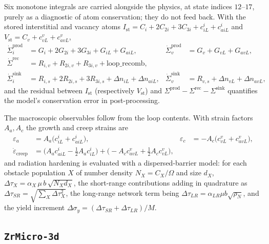 \documentclass{article}
\newcommand{\ZrM}{\texttt{ZrMicro-3d}}
\begin{document}
Six monotone integrals are carried alongside the physics, at state indices
$12\text{--}17$, purely as a diagnostic of atom conservation; they do not feed
back. With the stored interstitial and vacancy atoms
$I_{\mathrm{st}}=C_i+2C_{2i}+3C_{3i}+c_{iL}^{i}+c_{aiL}^{i}$ and
$V_{\mathrm{st}}=C_v+c_{vL}^{v}+c_{avL}^{v}$,
\begin{align}
\dot{\Sigma}^{\mathrm{prod}}_i &= G_i+2G_{2i}+3G_{3i}+G_{iL}+G_{aiL}, &
\dot{\Sigma}^{\mathrm{prod}}_v &= G_v+G_{vL}+G_{avL},\\
\dot{\Sigma}^{\mathrm{rec}} &= R_{i,v}+R_{2i,v}+R_{3i,v}+\text{loop\_recomb}, & & \\
\dot{\Sigma}^{\mathrm{sink}}_i &= R_{i,s}+2R_{2i,s}+3R_{3i,s}+\Delta n_{iL}+\Delta n_{aiL}, &
\dot{\Sigma}^{\mathrm{sink}}_v &= R_{v,s}+\Delta n_{vL}+\Delta n_{avL},
\end{align}
and the residual between $I_{\mathrm{st}}$ (respectively $V_{\mathrm{st}}$) and
$\Sigma^{\mathrm{prod}}-\Sigma^{\mathrm{rec}}-\Sigma^{\mathrm{sink}}$ quantifies
the model's conservation error in post-processing.

The macroscopic observables follow from the loop contents. With strain factors
$A_a,A_c$ the growth and creep strains are
\begin{align}
\varepsilon_a &= A_a\bigl(c_{iL}^{i}+c_{aiL}^{i}\bigr), &
\varepsilon_c &= -A_c\bigl(c_{vL}^{v}+c_{avL}^{v}\bigr),\\
\dot\varepsilon_{\mathrm{creep}} &= \bigl(A_a c_{aiL}^{i}-\tfrac12 A_a c_{iL}^{i}\bigr)
   +\bigl(-A_c c_{avL}^{v}+\tfrac12 A_c c_{vL}^{v}\bigr), & &
\end{align}
and radiation hardening is evaluated with a dispersed-barrier model: for each
obstacle population $X$ of number density $N_X=C_X/\Omega$ and size $d_X$,
$\Delta\tau_X=\alpha_X\,\mu\,b\,\sqrt{N_X d_X}$, the short-range contributions
adding in quadrature as $\Delta\tau_{SR}=\sqrt{\sum_X\Delta\tau_X^2}$, the
long-range network term being $\Delta\tau_{LR}=\alpha_{LR}\mu b\sqrt{\rho_N}$, and
the yield increment $\Delta\sigma_y=(\Delta\tau_{SR}+\Delta\tau_{LR})/M$.

\subsection{\ZrM{}}
\label{sec:zr3d}
\label{sec:changes}
\end{document}
